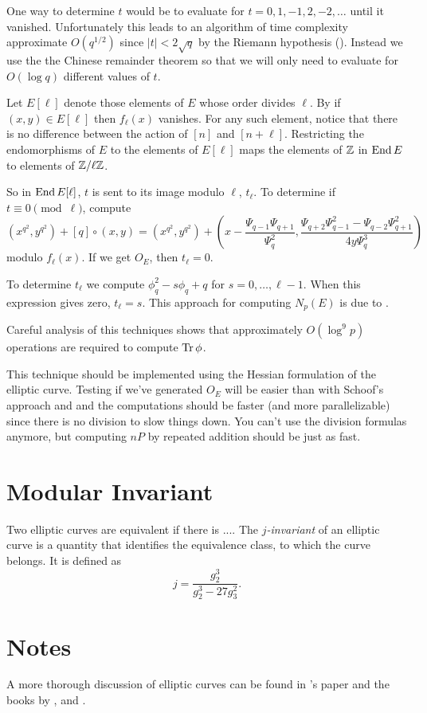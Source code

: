 One way to determine $t$ would be to evaluate
 for $t=0, 1, -1, 2, -2, \ldots$ until it
vanished.  Unfortunately this leads to an algorithm of time complexity
approximate $O(q^{1/2})$ since $|t| < 2\sqrt{q}$ by the Riemann
hypothesis ().  Instead we use the the
Chinese remainder theorem so that we will only need to evaluate
 for $O(\log q)$ different values of $t$.

Let $E[\ell]$ denote those elements of $E$ whose order divides $\ell$.
By  if $(x,y) \in E[\ell]$ then
$f_{\ell}(x)$ vanishes.  For any such element, notice that there is
no difference between the action of $[n]$ and $[n+\ell]$.  
Restricting the endomorphisms of  $E$ to the elements of $E[\ell]$
maps the elements of $\mathbb{Z}$ in $\mathop{\rm End}\nolimits E$ to elements of $\mathbb{Z}/\ell\mathbb{Z}$.

So in $\mathop{\rm End}\nolimits E[\ell]$, $t$ is sent to its image modulo $\ell$,
$t_{\ell}$. To determine if $t \equiv 0 \pmod{\ell}$, compute
\[
(x^{q^2}, y^{q^2}) + [q]\circ(x,y) = 
(x^{q^2}, y^{q^2}) + \left(x - \frac{\Psi_{q-1} \Psi_{q+1}}{\Psi_q^2},
\frac{\Psi_{q+2} \Psi_{q-1}^2 - \Psi_{q-2} \Psi_{q+1}^2}{4y
\Psi_q^3}\right)
\]
modulo $f_{\ell}(x)$.  If we get $O_E$, then $t_{\ell} = 0$.  

To determine $t_{\ell}$ we compute $\phi_q^2 - s \phi_q + q$ for $s =
0, \ldots, \ell -1$.  When this expression gives zero, $t_{\ell} = s$.
This approach for computing $N_p(E)$ is due to {\Schoof} \cite{Schoof:SQRT}.

Careful analysis of this techniques shows that approximately $O(\log^9
p)$ operations are required to compute $\mathop{\rm Tr}\nolimits \phi$.

This technique should be implemented using the Hessian formulation of
the elliptic curve.  Testing if we've generated $O_E$ will be easier
than with Schoof's approach and and the computations should be faster
(and more parallelizable) since there is no division to slow things
down.  You can't use the division formulas anymore, but computing $nP$
by repeated addition should be just as fast.


\section{Modular Invariant}

Two elliptic curves are equivalent if there is ....   The {\em $j$-invariant} of an elliptic curve is a quantity that
identifies the equivalence class, to which the curve belongs.  It is
defined as
\[
j = \frac{g_2^3}{g_2^3 - 27g_3^2}.
\]

\section*{Notes}

\footnotesize

A more thorough discussion of elliptic
curves can be found in {\Tate}'s paper \cite{Tate74} and the books
by {\Koblitz} \cite{Koblitz:Elliptic}, {\Lang} \cite{Lang:Elliptic} and
{\Silverman} \cite{SilvermanJH86}.

\normalsize
